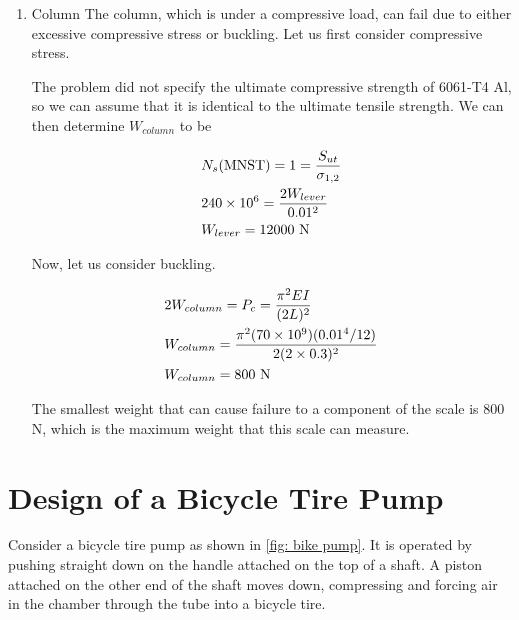 \documentclass[a4paper,openany,12pt]{book}
\begin{document}
{{\begin{enumerate}
\begin{enumerate}
\item Column
\label{column}
The column, which is under a compressive load, can fail due to either
excessive compressive stress or buckling. Let us first consider
compressive stress.

The problem did not specify the ultimate compressive strength of 6061-T4
Al, so we can assume that it is identical to the ultimate tensile
strength. We can then determine \(W_{column}\) to be

$$\begin{gathered}
  N_s\text{(MNST)} = 1 = \frac{S_{ut}}{\sigma_{1,2}} \hfill \\
  240 \times 10^6 = \frac{2W_{lever}}{0.01^2} \hfill \\
  W_{lever} = 12000\text{ N} \hfill \\ 
\end{gathered}$$

Now, let us consider buckling.

$$\begin{gathered}
  2W_{column} = P_c = \frac{\pi ^2EI}{(2L)^2} \hfill \\
  W_{column} = \frac{\pi ^2(70 \times 10^9)(0.01^4/12)}{2(2 \times 0.3)^2} \hfill \\
  W_{column} = 800\text{ N} \hfill \\ 
\end{gathered}$$

The smallest weight that can cause failure to a component of the scale
is 800 N, which is the maximum weight that this scale can measure.
\end{enumerate}
\end{enumerate}

\section{Design of a Bicycle Tire Pump}
\label{design-of-a-bicycle-tire-pump}
    Consider a bicycle tire pump as shown in
\ref{fig: bike pump}. It is operated by pushing
straight down on the handle attached on the top of a shaft. A piston
attached on the other end of the shaft moves down, compressing and
forcing air in the chamber through the tube into a bicycle tire.

}}
\end{document}
